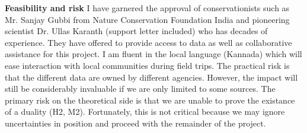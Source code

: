 \documentclass[a4paper,10pt,twocolumn]{article}
\newcommand{\hdg}[1] {\noindent \textbf{#1} }
\begin{document}
\hdg{Feasibility and risk}
I have garnered the approval of conservationists such as Mr. Sanjay Gubbi from Nature Conservation Foundation India and pioneering scientist Dr. Ullas Karanth (support letter included) who has decades of experience. They have offered to provide access to data as well as collaborative assistance for this project. I am fluent in the local language (Kannada) which will ease interaction with local communities during field trips. The practical risk is that the different data are owned by different agencies. However, the impact will still be considerably invaluable if we are only limited to some sources. The primary risk on the theoretical side is that we are unable to prove the existance of a duality (H2, M2). Fortunately, this is not critical because we may ignore uncertainties in position and proceed with the remainder of the project.



% 
% 
% 
% 
% 
% 
% 
% 



\vspace{-2em}
% 
{  \footnotesize }

\end{document}
